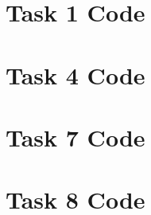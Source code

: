 \documentclass[12pt]{article}
\begin{document}
\appendix  
\clearpage
\addappheadtotoc 
\appendixpage 

\section{Task 1 Code}



\section{Task 4 Code}



\section{Task 7 Code}



\section{Task 8 Code}


\end{document}
